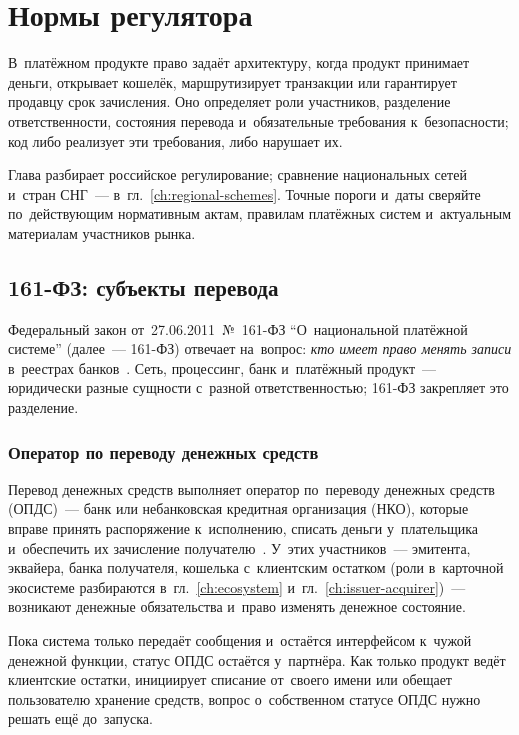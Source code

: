 
\chapter{Нормы регулятора}\label{ch:regulation}
В~платёжном продукте право задаёт архитектуру, когда продукт принимает деньги,
открывает кошелёк, маршрутизирует транзакции или гарантирует продавцу срок
зачисления. Оно определяет роли участников, разделение ответственности,
состояния перевода и~обязательные требования к~безопасности; код либо
реализует эти требования, либо нарушает их.

Глава разбирает российское регулирование; сравнение национальных сетей и~стран
СНГ~--- в~гл.~\ref{ch:regional-schemes}. Точные пороги и~даты сверяйте
по~действующим нормативным актам, правилам платёжных систем и~актуальным
материалам участников рынка.

\section{161-ФЗ: субъекты перевода}\label{sec:regulation-161fz}

Федеральный закон от~27.06.2011~№~161-ФЗ \enquote{О~национальной платёжной
системе} (далее~--- 161-ФЗ) отвечает на~вопрос: \emph{кто имеет право менять
записи} в~реестрах банков~\cite{fz-161}. Сеть, процессинг, банк и~платёжный
продукт~--- юридически разные сущности с~разной ответственностью; 161-ФЗ
закрепляет это разделение.

\subsection*{Оператор по переводу денежных средств}

Перевод денежных средств выполняет оператор по~переводу денежных средств
(ОПДС)~--- банк или небанковская кредитная организация (НКО), которые вправе
принять распоряжение к~исполнению, списать деньги у~плательщика и~обеспечить их
зачисление получателю~\cite{fz-161}. У~этих участников~--- эмитента, эквайера,
банка получателя, кошелька с~клиентским остатком (роли в~карточной экосистеме
разбираются в~гл.~\ref{ch:ecosystem} и~гл.~\ref{ch:issuer-acquirer})~---
возникают денежные обязательства и~право изменять денежное состояние.

Пока система только передаёт сообщения и~остаётся интерфейсом к~чужой денежной
функции, статус ОПДС остаётся у~партнёра. Как только продукт ведёт клиентские
остатки, инициирует списание от~своего имени или обещает пользователю хранение
средств, вопрос о~собственном статусе ОПДС нужно решать ещё до~запуска.

